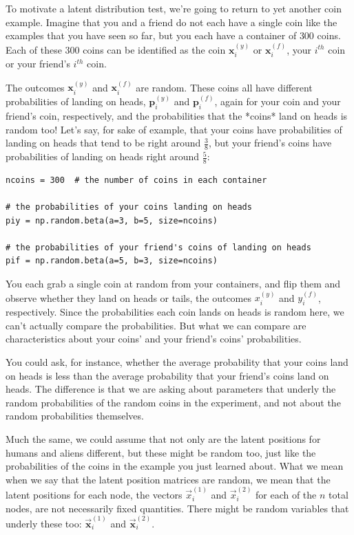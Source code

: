 To motivate a latent distribution test, we're going to return to yet another coin example. Imagine that you and a friend do not each have a single coin like the examples that you have seen so far, but you each have a container of $300$ coins. Each of these $300$ coins can be identified as the coin $\mathbf x_i^{(y)}$ or $\mathbf x_i^{(f)}$, your $i^{th}$ coin or your friend's $i^{th}$ coin. 

The outcomes $\mathbf x_i^{(y)}$ and $\mathbf x_i^{(f)}$ are random. These coins all have different probabilities of landing on heads, $\mathbf p_i^{(y)}$ and $\mathbf p_i^{(f)}$, again for your coin and your friend's coin, respectively, and the probabilities that the *coins* land on heads is random too! Let's say, for sake of example, that your coins have probabilities of landing on heads that tend to be right around $\frac{3}{8}$, but your friend's coins have probabilities of landing on heads right around $\frac{5}{8}$:

\begin{lstlisting}[style=python]
ncoins = 300  # the number of coins in each container

# the probabilities of your coins landing on heads
piy = np.random.beta(a=3, b=5, size=ncoins)

# the probabilities of your friend's coins of landing on heads
pif = np.random.beta(a=5, b=3, size=ncoins)
\end{lstlisting}
You each grab a single coin at random from your containers, and flip them and observe whether they land on heads or tails, the outcomes $x_i^{(y)}$ and $y_i^{(f)}$, respectively. Since the probabilities each coin lands on heads is random here, we can't actually compare the probabilities. But what we can compare are characteristics about your coins' and your friend's coins' probabilities. 

You could ask, for instance, whether the average probability that your coins land on heads is less than the average probability that your friend's coins land on heads. The difference is that we are asking about parameters that underly the random probabilities of the random coins in the experiment, and not about the random probabilities themselves.

Much the same, we could assume that not only are the latent positions for humans and aliens different, but these might be random too, just like the probabilities of the coins in the example you just learned about. What we mean when we say that the latent position matrices are random, we mean that the latent positions for each node, the vectors $\vec x_i^{(1)}$ and $\vec x_i^{(2)}$ for each of the $n$ total nodes, are not necessarily fixed quantities. There might be random variables that underly these too: $\mathbf{\vec x}_i^{(1)}$ and $\mathbf{\vec x}_i^{(2)}$. 


